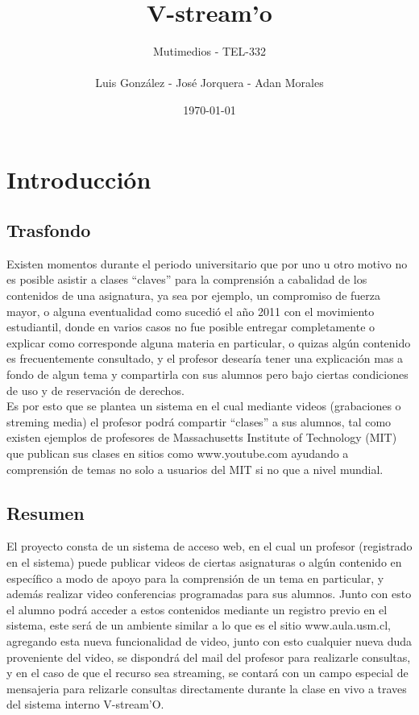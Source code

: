 \documentclass[12pt]{article}
\title{V-stream'o}
\author{Mutimedios - TEL-332\\\\Luis González - José Jorquera - Adan Morales}
\date{\today}
\begin{document}
\maketitle
\newpage
\tableofcontents
\thispagestyle{empty}

\newpage
\section{Introducción}
\subsection{Trasfondo}
Existen momentos durante el periodo universitario que por uno u otro motivo no es posible asistir a clases 
``claves'' para la comprensión a cabalidad de los contenidos de una asignatura, ya sea por ejemplo, un 
compromiso de fuerza mayor, o alguna eventualidad como sucedió el a\~no 2011 con el movimiento estudiantil, 
donde en varios casos no fue posible entregar completamente o explicar como corresponde alguna materia 
en particular, o quizas algún contenido es frecuentemente consultado, y el profesor desearía tener una 
explicación mas a fondo de algun tema y compartirla con sus alumnos pero bajo ciertas condiciones de uso
y de reservación de derechos.\\

Es por esto que se plantea un sistema en el cual mediante videos (grabaciones o streming media) el profesor
podrá compartir ``clases'' a sus alumnos, tal como existen ejemplos de profesores de Massachusetts Institute 
of Technology (MIT) que publican sus clases en sitios como www.youtube.com ayudando a comprensión de temas
no solo a usuarios del MIT si no que a nivel mundial.

\subsection{Resumen}
El proyecto consta de un sistema de acceso web, en el cual un profesor (registrado en el sistema) puede 
publicar videos de ciertas asignaturas o algún contenido en específico a modo de apoyo para la comprensión
de un tema en particular, y además realizar video conferencias programadas para sus alumnos. Junto con esto
el alumno podrá acceder a estos contenidos mediante un registro previo en el sistema,
este será de un ambiente similar a lo que es el sitio www.aula.usm.cl, agregando esta nueva
funcionalidad de video, junto con esto cualquier nueva duda proveniente del video, se dispondrá del mail 
del profesor para realizarle consultas, y en el caso de que el recurso sea streaming, se contará con un campo
especial de mensajeria para relizarle consultas directamente durante la clase en vivo a traves del sistema
interno V-stream'O.
\end{document}
